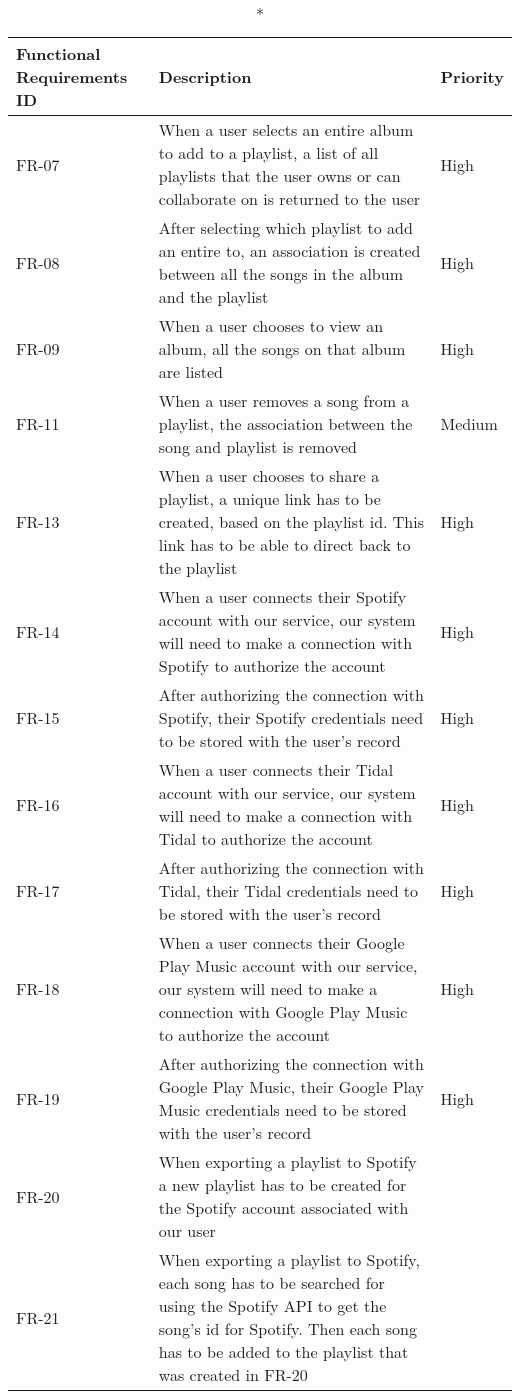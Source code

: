 \begin{longtable}{lXl}
			\caption*{Functional Requirements}
			\endfirsthead
			\endhead
			ID & Description & Priority \\\hline
			FR-07 & When a user selects an entire album to add to a playlist, a list of all playlists that the user owns or can collaborate on is returned to the user & High \\
			FR-08 & After selecting which playlist to add an entire to, an association is created between all the songs in the album and the playlist & High \\
			FR-09 & When a user chooses to view an album, all the songs on that album are listed & High \\
			FR-11 & When a user removes a song from a playlist, the association between the song and playlist is removed & Medium \\
			FR-13 & When a user chooses to share a playlist, a unique link has to be created, based on the playlist id. This link has to be able to direct back to the playlist & High \\
			FR-14 & When a user connects their Spotify account with our service, our system will need to make a connection with Spotify to authorize the account & High \\
			FR-15 & After authorizing the connection with Spotify, their Spotify credentials need to be stored with the user's record & High \\
			FR-16 & When a user connects their Tidal account with our service, our system will need to make a connection with Tidal to authorize the account & High \\
			FR-17 & After authorizing the connection with Tidal, their Tidal credentials need to be stored with the user's record & High \\
			FR-18 & When a user connects their Google Play Music account with our service, our system will need to make a connection with Google Play Music to authorize the account & High \\
			FR-19 & After authorizing the connection with Google Play Music, their Google Play Music credentials need to be stored with the user's record & High \\
			FR-20 & When exporting a playlist to Spotify a new playlist has to be created for the Spotify account associated with our user & \\
			FR-21 & When exporting a playlist to Spotify, each song has to be searched for using the Spotify API to get the song's id for Spotify. Then each song has to be added to the playlist that was created in FR-20 & \\

\end{longtable}
